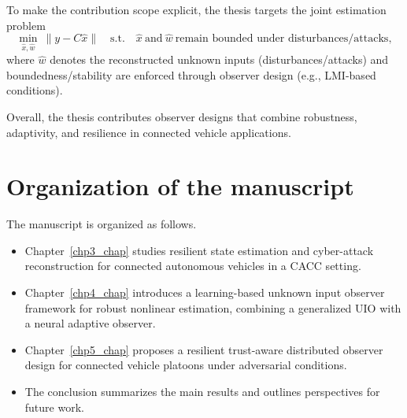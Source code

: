 To make the contribution scope explicit, the thesis targets the joint estimation problem
\begin{equation}\label{eq:intro_goal}
\min_{\widehat{x},\widehat{w}}\ \|y-C\widehat{x}\| \quad \text{s.t.} \quad \widehat{x}\ \text{and}\ \widehat{w}\ \text{remain bounded under disturbances/attacks},
\end{equation}
where $\widehat{w}$ denotes the reconstructed unknown inputs (disturbances/attacks) and boundedness/stability are enforced through observer design (e.g., LMI-based conditions).

Overall, the thesis contributes observer designs that combine robustness, adaptivity, and resilience in connected vehicle applications.

\section{Organization of the manuscript}

The manuscript is organized as follows.
\begin{itemize}
    \item Chapter~\ref{chp3_chap} studies resilient state estimation and cyber-attack reconstruction for connected autonomous vehicles in a CACC setting.
    \item Chapter~\ref{chp4_chap} introduces a learning-based unknown input observer framework for robust nonlinear estimation, combining a generalized UIO with a neural adaptive observer.
    \item Chapter~\ref{chp5_chap} proposes a resilient trust-aware distributed observer design for connected vehicle platoons under adversarial conditions.
    \item The conclusion summarizes the main results and outlines perspectives for future work.
\end{itemize}
